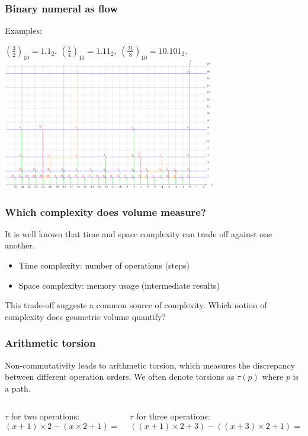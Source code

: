 \documentclass[aspectratio=169]{beamer}
\begin{document}
\begin{frame}
    \frametitle{Binary numeral as flow}
            Examples:
    \begin{center}
         $\left(\frac{3}{2}\right)_{10} = 1.1_{2},\ \left(\frac{7}{4}\right)_{10} = 1.11_{2},\ \left(\frac{21}{8}\right)_{10} = 10.101_{2}.$
        \includegraphics[width=0.7\textwidth]{../images/multiplication}
    \end{center}
\end{frame}

\begin{frame}
    \frametitle{Which complexity does volume measure?}
    It is well known that time and space complexity can trade off against one another.
    \begin{itemize}
        \item Time complexity: number of operations (steps)
        \item Space complexity: memory usage (intermediate results)
    \end{itemize}
    This trade-off suggests a common source of complexity. Which notion of complexity does geometric volume quantify?
\end{frame}

\begin{frame}
    \frametitle{Arithmetic torsion}
    Non-commutativity leads to arithmetic torsion, which measures the discrepancy between different operation orders.
    We often denote torsions as \(\tau(p)\) where $p$ is a path.
    \newline\newline
    \begin{columns}
        \begin{column}{0.5\textwidth}
            $\tau$ for two operations:
            $$(x + 1) \times 2 - (x \times 2 + 1) = 1$$
        \end{column}
        \begin{column}{0.5\textwidth}
            $\tau$ for three operations:
            $$((x + 1) \times 2 + 3) - ((x + 3) \times 2 + 1) = -2$$
        \end{column}
    \end{columns}
\end{frame}
\end{document}
